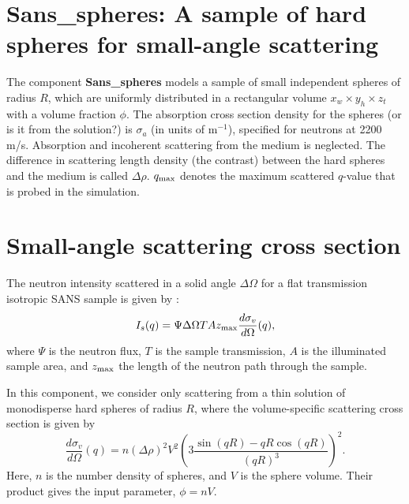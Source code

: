 \section{Sans\_spheres: A sample of hard spheres for small-angle scattering}
\label{sans}


The component {\bf Sans\_spheres} models a sample of small independent
spheres of radius $R$, which are uniformly distributed
in a rectangular volume $x_w \times y_h \times z_t$ with a volume
fraction $\phi$. The absorption cross section density for the spheres
(or is it from the solution?)
is $\sigma_a$ (in units of m$^{-1}$), specified
for neutrons at 2200 m/s. Absorption and incoherent scattering from the medium
is neglected.
The difference in scattering length density
(the contrast) between the hard spheres and the medium is called $\Delta \rho$.
$q_{\rm max}$ denotes the maximum scattered $q$-value that is probed
in the simulation.

\section{Small-angle scattering cross section}
The neutron intensity scattered in a solid angle $\Delta \Omega$
for a flat transmission isotropic SANS sample is given by \cite{ILLblue}:
\begin{equation}
I_s(q) = \Psi \Delta\Omega T A z_{\rm max} \frac{d\sigma_v}{d\Omega}(q) ,
\end{equation}
where $\Psi$ is the neutron flux, $T$ is the sample transmission,
$A$ is the illuminated sample area, and $z_{\rm max}$ the length of
the neutron path through the sample.

In this component, we consider only scattering from a thin solution
of monodisperse hard spheres of radius $R$, where the volume-specific
scattering cross section is given by \cite{ILLblue}
\begin{equation}
\frac{d\sigma_v}{d\Omega}(q) =
  n (\Delta\rho)^2 V^2 \left( 3\frac{\sin(qR)-qR\cos(qR)}{(qR)^3} \right)^2 .
\end{equation}
Here, $n$ is the number density of spheres, and $V$ is the
sphere volume. Their product gives the input parameter, $\phi=nV$.


